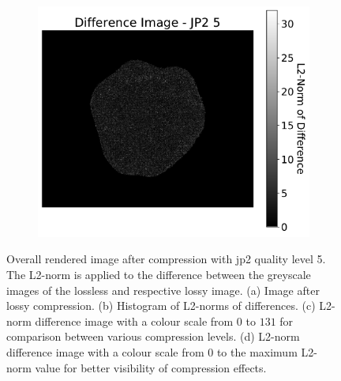 \begin{figure}[htb]
    \begin{subfigure}[b]{0.48\textwidth}
        \centering
        \includegraphics[width=\textwidth]{doc/thesis/0_figures/compare_quality/set1/jp2_5_diff_heatmap_rel}
        \caption{}
        \label{fig:img_quality_comp_jp2_5_diff_rel}
    \end{subfigure}
    \caption{Overall rendered image after compression with \gls{jp2} quality level 5. The L2-norm is applied to the difference between the greyscale images of the lossless and respective lossy image. (a) Image after lossy compression. (b) Histogram of L2-norms of differences. (c) L2-norm difference image with a colour scale from $0$ to $131$ for comparison between various compression levels. (d) L2-norm difference image with a colour scale from $0$ to the maximum L2-norm value for better visibility of compression effects.}
    \label{fig:img_quality_comp_jp2_5}
\end{figure}


